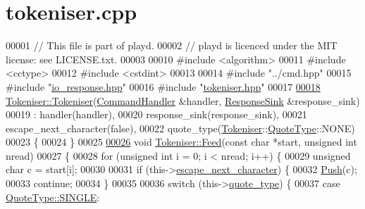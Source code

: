 \hypertarget{tokeniser_8cpp_source}{\section{tokeniser.\+cpp}
\label{tokeniser_8cpp_source}
}

\begin{DoxyCode}
00001 \textcolor{comment}{// This file is part of playd.}
00002 \textcolor{comment}{// playd is licenced under the MIT license: see LICENSE.txt.}
00003 
00010 \textcolor{preprocessor}{#include <algorithm>}
00011 \textcolor{preprocessor}{#include <cctype>}
00012 \textcolor{preprocessor}{#include <cstdint>}
00013 
00014 \textcolor{preprocessor}{#include "../cmd.hpp"}
00015 \textcolor{preprocessor}{#include "\hyperlink{io__response_8hpp}{io\_response.hpp}"}
00016 \textcolor{preprocessor}{#include "\hyperlink{tokeniser_8hpp}{tokeniser.hpp}"}
00017 
\hypertarget{tokeniser_8cpp_source_l00018}{}\hyperlink{classTokeniser_ac69ac105eaf7d81e0632329ee46d2a57}{00018} \hyperlink{classTokeniser_ac69ac105eaf7d81e0632329ee46d2a57}{Tokeniser::Tokeniser}(\hyperlink{classCommandHandler}{CommandHandler} &handler, 
      \hyperlink{classResponseSink}{ResponseSink} &response\_sink)
00019     : handler(handler),
00020       response\_sink(response\_sink),
00021       escape\_next\_character(false),
00022       quote\_type(\hyperlink{classTokeniser}{Tokeniser}::\hyperlink{classTokeniser_a71d622e60fae9d6c36c96ba69a4f62e4}{QuoteType}::NONE)
00023 \{
00024 \}
00025 
\hypertarget{tokeniser_8cpp_source_l00026}{}\hyperlink{classTokeniser_ab4b8f1238c89d766a1d72f0ee619406d}{00026} \textcolor{keywordtype}{void} \hyperlink{classTokeniser_ab4b8f1238c89d766a1d72f0ee619406d}{Tokeniser::Feed}(\textcolor{keyword}{const} \textcolor{keywordtype}{char} *start, \textcolor{keywordtype}{unsigned} \textcolor{keywordtype}{int} nread)
00027 \{
00028     \textcolor{keywordflow}{for} (\textcolor{keywordtype}{unsigned} \textcolor{keywordtype}{int} i = 0; i < nread; i++) \{
00029         \textcolor{keywordtype}{unsigned} \textcolor{keywordtype}{char} c = start[i];
00030 
00031         \textcolor{keywordflow}{if} (this->\hyperlink{classTokeniser_ace181afc0f1425b87126becc79458edd}{escape\_next\_character}) \{
00032             \hyperlink{classTokeniser_a0c62f5dd06a42d478a93595fc78b76fa}{Push}(c);
00033             \textcolor{keywordflow}{continue};
00034         \}
00035 
00036         \textcolor{keywordflow}{switch} (this->\hyperlink{classTokeniser_a10b7147e055edd438fcb951fc41faf65}{quote\_type}) \{
00037             \textcolor{keywordflow}{case} \hyperlink{classTokeniser_a71d622e60fae9d6c36c96ba69a4f62e4a0679273e201afd0bf57af3961f8a23b8}{QuoteType::SINGLE}:

\end{DoxyCode}

